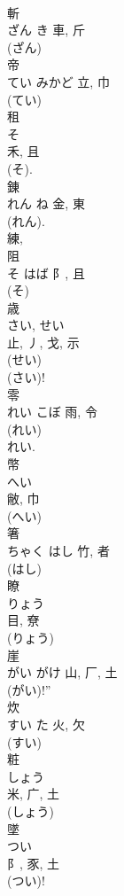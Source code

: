 \documentclass[8pt]{extreport}
\begin{document}
\begin{CJK}{UTF8}{min}
\\	斬	
\\	ざん	き	車, 斤	
\\	(ざん) 
\\	帝	
\\	てい	みかど	立, 巾	
\\	(てい) 
\\	租	
\\	そ	
\\	禾, 且	
\\	(そ).	
\\	錬	
\\	れん	ね	金, 東	
\\	(れん). 
\\	練, 
\\	阻	
\\	そ	はば	阝, 且	
\\	(そ) 
\\	歳	
\\	さい, せい	
\\	止, 丿, 戈, 示	
\\	(せい) 
\\	(さい)!
\\	零	
\\	れい	こぼ	雨, 令	
\\	(れい) 
\\	れい.
\\	幣	
\\	へい	
\\	敝, 巾	
\\	(へい) 
\\	箸	
\\	ちゃく	はし	竹, 者	
\\	(はし) 
\\	瞭	
\\	りょう	
\\	目, 尞	
\\	(りょう) 
\\	崖	
\\	がい	がけ	山, 厂, 土	
\\	(がい)!” 
\\	炊	
\\	すい	た	火, 欠	
\\	(すい) 
\\	粧	
\\	しょう	
\\	米, 广, 土	
\\	(しょう) 
\\	墜	
\\	つい	
\\	阝, 豕, 土		
\\	(つい)!

\end{CJK}
\end{document}
